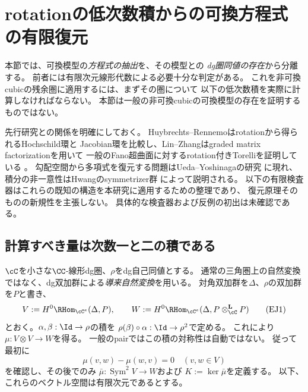 \section{rotationの低次数積からの可換方程式の有限復元}
\label{sec:explicit-jacobian-recovery}

本節では、可換模型の\emph{方程式の抽出}を、その模型との
\emph{dg圏同値の存在}から分離する。
前者には有限次元線形代数による必要十分な判定がある。
これを非可換cubicの残余圏に適用するには、まずその圏について
以下の低次数積を実際に計算しなければならない。
本節は一般の非可換cubicの可換模型の存在を証明するものではない。

先行研究との関係を明確にしておく。
Huybrechts--Rennemoはrotationから得られるHochschild環と
Jacobian環を比較し\cite{HR}、Lin--Zhangはgraded matrix factorizationを用いて
一般のFano超曲面に対するrotation付きTorelliを証明している
\cite[Theorem~3.5, Remark~3.6, Section~5]{LZ}。
勾配空間から多項式を復元する問題はUeda--Yoshinagaの研究
\cite[Lemma~3]{ExplicitUedaYoshinaga}に現れ、
積分の非一意性はHwangのsymmetrizer群
\cite[Theorems~1.5--1.6]{ExplicitHwang}によって説明される。
以下の有限検査器はこれらの既知の構造を本研究に適用するための整理であり、
復元原理そのものの新規性を主張しない。
具体的な検査器および反例の初出は未確認である。

\subsection{計算すべき量は次数一と二の積である}

$\cC$を小さな$\CC$-線形dg圏、$\rho$をdg自己同値とする。
通常の三角圏上の自然変換ではなく、dg双加群による\emph{導来自然変換}を用いる。
対角双加群を$\Delta$、$\rho$の双加群を$P$と書き、
\[
 V:=H^0\RHom_{\cC^e}(\Delta,P),\qquad
 W:=H^0\RHom_{\cC^e}(\Delta,P\otimes^{\mathbf L}_{\cC}P)
 \tag{EJ1}\label{eq:ej-low-degree}
\]
とおく。$\alpha,\beta:\Id\to\rho$の積を
$\rho(\beta)\circ\alpha:\Id\to\rho^2$で定める。
これにより$\mu:V\otimes V\to W$を得る。
一般のpairではこの積の対称性は自動ではない。
従って最初に
\[
 \mu(v,w)-\mu(w,v)=0\quad(v,w\in V)
 \tag{EJ2}\label{eq:ej-commutativity}
\]
を確認し、その後でのみ
$\bar\mu:\operatorname{Sym}^2V\to W$および
$K:=\ker\bar\mu$を定義する。
以下、これらのベクトル空間は有限次元であるとする。

